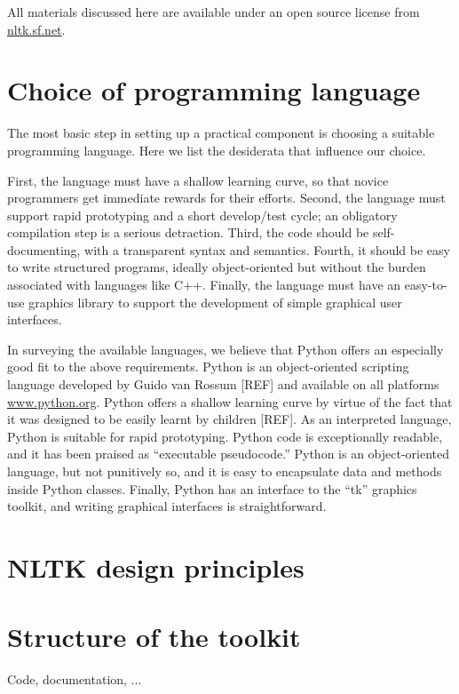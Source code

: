 \documentclass[11pt]{article}
\begin{document}
All materials discussed here are available under an open
source license from \url{nltk.sf.net}.

\section{Choice of programming language}

The most basic step in setting up a practical component is choosing a
suitable programming language.  Here we list the desiderata that influence
our choice.

First, the language must have a shallow learning curve, so that novice
programmers get immediate rewards for their efforts.
Second, the language must support rapid prototyping and a short develop/test cycle;
an obligatory compilation step is a serious detraction.
Third, the code should be self-documenting,
with a transparent syntax and semantics.
Fourth, it should be easy to write structured programs, ideally object-oriented
but without the burden associated with languages like C++.
Finally, the language must have an easy-to-use graphics library to support
the development of simple graphical user interfaces.

In surveying the available languages, we believe that Python offers an especially good
fit to the above requirements.  Python is an object-oriented scripting language
developed by Guido van Rossum [REF] and available on all platforms
\url{www.python.org}.
Python offers a shallow learning curve by virtue of the
fact that it was designed to be easily learnt by children [REF].
As an interpreted language, Python is suitable for rapid prototyping.
Python code is exceptionally readable, and it has been praised as
``executable pseudocode.''
Python is an object-oriented language, but not punitively so, and it
is easy to encapsulate data and methods inside Python classes.
Finally, Python has an interface to the ``tk'' graphics toolkit, and
writing graphical interfaces is straightforward.

\section{NLTK design principles}


\section{Structure of the toolkit}

Code, documentation, ...
\end{document}
